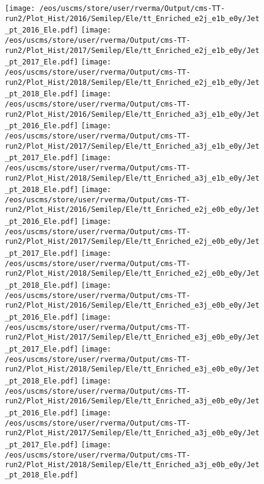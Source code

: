 \begin{figure}
\centering
\texttt{[image: /eos/uscms/store/user/rverma/Output/cms-TT-run2/Plot\_Hist/2016/Semilep/Ele/tt\_Enriched\_e2j\_e1b\_e0y/Jet\_pt\_2016\_Ele.pdf]}
\texttt{[image: /eos/uscms/store/user/rverma/Output/cms-TT-run2/Plot\_Hist/2017/Semilep/Ele/tt\_Enriched\_e2j\_e1b\_e0y/Jet\_pt\_2017\_Ele.pdf]}
\texttt{[image: /eos/uscms/store/user/rverma/Output/cms-TT-run2/Plot\_Hist/2018/Semilep/Ele/tt\_Enriched\_e2j\_e1b\_e0y/Jet\_pt\_2018\_Ele.pdf]}
\texttt{[image: /eos/uscms/store/user/rverma/Output/cms-TT-run2/Plot\_Hist/2016/Semilep/Ele/tt\_Enriched\_a3j\_e1b\_e0y/Jet\_pt\_2016\_Ele.pdf]}
\texttt{[image: /eos/uscms/store/user/rverma/Output/cms-TT-run2/Plot\_Hist/2017/Semilep/Ele/tt\_Enriched\_a3j\_e1b\_e0y/Jet\_pt\_2017\_Ele.pdf]}
\texttt{[image: /eos/uscms/store/user/rverma/Output/cms-TT-run2/Plot\_Hist/2018/Semilep/Ele/tt\_Enriched\_a3j\_e1b\_e0y/Jet\_pt\_2018\_Ele.pdf]}
\texttt{[image: /eos/uscms/store/user/rverma/Output/cms-TT-run2/Plot\_Hist/2016/Semilep/Ele/tt\_Enriched\_e2j\_e0b\_e0y/Jet\_pt\_2016\_Ele.pdf]}
\texttt{[image: /eos/uscms/store/user/rverma/Output/cms-TT-run2/Plot\_Hist/2017/Semilep/Ele/tt\_Enriched\_e2j\_e0b\_e0y/Jet\_pt\_2017\_Ele.pdf]}
\texttt{[image: /eos/uscms/store/user/rverma/Output/cms-TT-run2/Plot\_Hist/2018/Semilep/Ele/tt\_Enriched\_e2j\_e0b\_e0y/Jet\_pt\_2018\_Ele.pdf]}
\texttt{[image: /eos/uscms/store/user/rverma/Output/cms-TT-run2/Plot\_Hist/2016/Semilep/Ele/tt\_Enriched\_e3j\_e0b\_e0y/Jet\_pt\_2016\_Ele.pdf]}
\texttt{[image: /eos/uscms/store/user/rverma/Output/cms-TT-run2/Plot\_Hist/2017/Semilep/Ele/tt\_Enriched\_e3j\_e0b\_e0y/Jet\_pt\_2017\_Ele.pdf]}
\texttt{[image: /eos/uscms/store/user/rverma/Output/cms-TT-run2/Plot\_Hist/2018/Semilep/Ele/tt\_Enriched\_e3j\_e0b\_e0y/Jet\_pt\_2018\_Ele.pdf]}
\texttt{[image: /eos/uscms/store/user/rverma/Output/cms-TT-run2/Plot\_Hist/2016/Semilep/Ele/tt\_Enriched\_a3j\_e0b\_e0y/Jet\_pt\_2016\_Ele.pdf]}
\texttt{[image: /eos/uscms/store/user/rverma/Output/cms-TT-run2/Plot\_Hist/2017/Semilep/Ele/tt\_Enriched\_a3j\_e0b\_e0y/Jet\_pt\_2017\_Ele.pdf]}
\texttt{[image: /eos/uscms/store/user/rverma/Output/cms-TT-run2/Plot\_Hist/2018/Semilep/Ele/tt\_Enriched\_a3j\_e0b\_e0y/Jet\_pt\_2018\_Ele.pdf]}
\end{figure}

